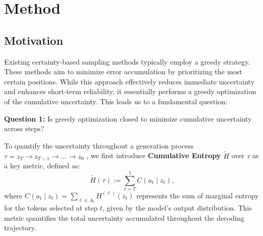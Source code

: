 \vspace{-3mm}
\section{Method}


\subsection{Motivation}
\label{sec:motivation}
Existing certainty-based sampling methods typically employ a greedy strategy. These methods aim to minimize error accumulation by prioritizing the most certain positions. While this approach effectively reduces immediate uncertainty and enhances short-term reliability, it essentially performs a greedy optimization of the cumulative uncertainty. This leads us to a fundamental question:

\begin{observationbox}
\textbf{Question 1:}
Is greedy optimization closed to minimize cumulative uncertainty across steps?
\end{observationbox}

To quantify the uncertainty throughout a generation process $\tau =z_T\rightarrow z_{T-1}\rightarrow\ldots\rightarrow z_0$ , we first introduce 
\textbf{Cumulative Entropy} $\tilde{H}$ over $\tau$ as a key metric, defined as:
\begin{equation}
    \tilde{H}(\tau):= \sum_{t=T}^{1} C(a_t \mid z_t),
\end{equation}
where $C(a_t\mid z_t) = \sum_{\ell \in A_t} H^{(\ell)}(z_t)$ represents the sum of marginal entropy for the tokens selected at step $t$, given by the model's output distribution. This metric quantifies the total uncertainty accumulated throughout the decoding trajectory.

